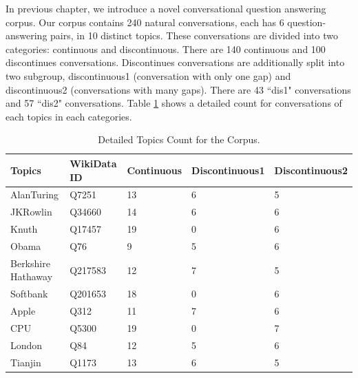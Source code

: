\documentclass[bsc,frontabs,twoside,singlespacing,parskip,deptreport]{infthesis}     %
\begin{document}
In previous chapter, we introduce a novel conversational question answering corpus. Our corpus contains 240 natural conversations, each has 6 question-answering pairs, in 10 distinct topics. These conversations are divided into two categories: continuous and discontinuous. There are 140 continuous and 100 discontinues conversations. Discontinues conversations are additionally split into two subgroup, discontinuous1 (conversation with only one gap) and discontinuous2 (conversations with many gaps). There are 43 ``dis1" conversations and 57 ``dis2" conversations. Table \ref{tab:topiccount} shows a detailed count for conversations of each topics in each categories.

\begin{table}[]
\begin{tabular}{|l|l|l|l|l|}
\hline
Topics             & WikiData ID & Continuous & Discontinuous1 & Discontinuous2 \\ \hline
AlanTuring         & Q7251       & 13         & 6              & 5              \\ \hline
JKRowlin           & Q34660      & 14         & 6              & 6              \\ \hline
Knuth              & Q17457      & 19         & 0              & 6              \\ \hline
Obama              & Q76         & 9          & 5              & 6              \\ \hline
Berkshire Hathaway & Q217583     & 12         & 7              & 5              \\ \hline
Softbank           & Q201653     & 18         & 0              & 6              \\ \hline
Apple              & Q312        & 11         & 7              & 6              \\ \hline
CPU                & Q5300       & 19         & 0              & 7              \\ \hline
London             & Q84         & 12         & 5              & 6              \\ \hline
Tianjin            & Q1173       & 13         & 6              & 5              \\ \hline
\end{tabular}
\caption{Detailed Topics Count for the Corpus.}
\label{tab:topiccount}
\end{table}
\end{document}
